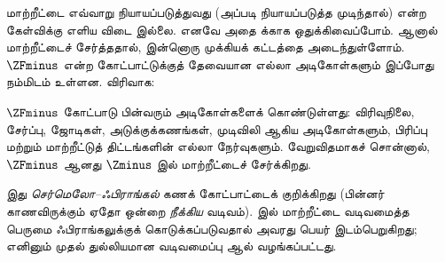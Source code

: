 \documentclass[../../../include/open-logic-section]{subfiles}
\begin{document}

மாற்றீட்டை எவ்வாறு நியாயப்படுத்துவது (அப்படி நியாயப்படுத்த முடிந்தால்) என்ற
கேள்விக்கு எளிய விடை இல்லை. எனவே அதை  க்காக
ஒதுக்கிவைப்போம். ஆனால் மாற்றீட்டைச் சேர்த்ததால், இன்னொரு முக்கியக் கட்டத்தை
அடைந்துள்ளோம். $\ZFminus$ என்ற கோட்பாட்டுக்குத் தேவையான எல்லா அடிகோள்களும்
இப்போது நம்மிடம் உள்ளன. விரிவாக:

\begin{defn}
$\ZFminus$ கோட்பாடு பின்வரும் அடிகோள்களைக் கொண்டுள்ளது: விரிவுநிலை,
சேர்ப்பு, ஜோடிகள், அடுக்குக்கணங்கள், முடிவிலி ஆகிய அடிகோள்களும், பிரிப்பு
மற்றும் மாற்றீட்டுத் திட்டங்களின் எல்லா நேர்வுகளும். வேறுவிதமாகச் சொன்னால்,
$\ZFminus$ ஆனது $\Zminus$ இல் மாற்றீட்டைச் சேர்க்கிறது.
\end{defn}
\noindent
இது \emph{செர்மெலோ--ஃபிராங்கல்} கணக் கோட்பாட்டைக் குறிக்கிறது (பின்னர்
காணவிருக்கும் ஏதோ ஒன்றை \emph{நீக்கிய} வடிவம்). \citeyear{Fraenkel1922}
இல் மாற்றீட்டை வடிவமைத்த பெருமை ஃபிராங்கலுக்குக் கொடுக்கப்படுவதால் அவரது
பெயர் இடம்பெறுகிறது; எனினும் முதல் துல்லியமான வடிவமைப்பு
\citet{Skolem1922} ஆல் வழங்கப்பட்டது.
\end{document}
